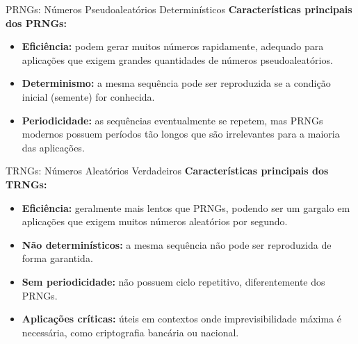 \begin{frame}{PRNGs: Números Pseudoaleatórios Determinísticos}
    \textbf{Características principais dos PRNGs:}

    \begin{itemize}
        \item \textbf{Eficiência:} podem gerar muitos números rapidamente, adequado para aplicações que exigem grandes quantidades de números pseudoaleatórios.
        \item \textbf{Determinismo:} a mesma sequência pode ser reproduzida se a condição inicial (semente) for conhecida.
        \item \textbf{Periodicidade:} as sequências eventualmente se repetem, mas PRNGs modernos possuem períodos tão longos que são irrelevantes para a maioria das aplicações.
    \end{itemize}

\end{frame}

\begin{frame}{TRNGs: Números Aleatórios Verdadeiros}
    \textbf{Características principais dos TRNGs:}

    \begin{itemize}
        \item \textbf{Eficiência:} geralmente mais lentos que PRNGs, podendo ser um gargalo em aplicações que exigem muitos números aleatórios por segundo.
        \item \textbf{Não determinísticos:} a mesma sequência não pode ser reproduzida de forma garantida.
        \item \textbf{Sem periodicidade:} não possuem ciclo repetitivo, diferentemente dos PRNGs.
        \item \textbf{Aplicações críticas:} úteis em contextos onde imprevisibilidade máxima é necessária, como criptografia bancária ou nacional.
    \end{itemize}

\end{frame}

